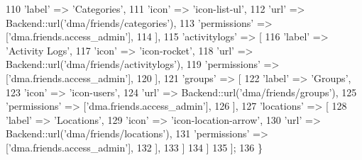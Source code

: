 \begin{DoxyCode}
110                         \textcolor{stringliteral}{'label'}         => \textcolor{stringliteral}{'Categories'},
111                         \textcolor{stringliteral}{'icon'}          => \textcolor{stringliteral}{'icon-list-ul'},
112                         \textcolor{stringliteral}{'url'}           => Backend::url(\textcolor{stringliteral}{'dma/friends/categories'}),
113                         \textcolor{stringliteral}{'permissions'}   => [\textcolor{stringliteral}{'dma.friends.access\_admin'}],
114                     ],  
115                     \textcolor{stringliteral}{'activitylogs'}   => [
116                         \textcolor{stringliteral}{'label'}         => \textcolor{stringliteral}{'Activity Logs'},
117                         \textcolor{stringliteral}{'icon'}          => \textcolor{stringliteral}{'icon-rocket'},
118                         \textcolor{stringliteral}{'url'}           => Backend::url(\textcolor{stringliteral}{'dma/friends/activitylogs'}),
119                         \textcolor{stringliteral}{'permissions'}   => [\textcolor{stringliteral}{'dma.friends.access\_admin'}],
120                     ],
121                     \textcolor{stringliteral}{'groups'}   => [
122                         \textcolor{stringliteral}{'label'}         => \textcolor{stringliteral}{'Groups'},
123                         \textcolor{stringliteral}{'icon'}          => \textcolor{stringliteral}{'icon-users'},
124                         \textcolor{stringliteral}{'url'}           => Backend::url(\textcolor{stringliteral}{'dma/friends/groups'}),
125                         \textcolor{stringliteral}{'permissions'}   => [\textcolor{stringliteral}{'dma.friends.access\_admin'}],
126                     ],
127                     \textcolor{stringliteral}{'locations'} => [
128                         \textcolor{stringliteral}{'label'}         => \textcolor{stringliteral}{'Locations'},
129                         \textcolor{stringliteral}{'icon'}          => \textcolor{stringliteral}{'icon-location-arrow'},
130                         \textcolor{stringliteral}{'url'}           => Backend::url(\textcolor{stringliteral}{'dma/friends/locations'}),
131                         \textcolor{stringliteral}{'permissions'}   => [\textcolor{stringliteral}{'dma.friends.access\_admin'}],
132                     ],                
133                 ]
134             ]
135         ];
136     \}
\end{DoxyCode}
\hypertarget{classDMA_1_1Friends_1_1Plugin_a1f5f007ec6f0f3f16516cf1a2e19d296}{}
